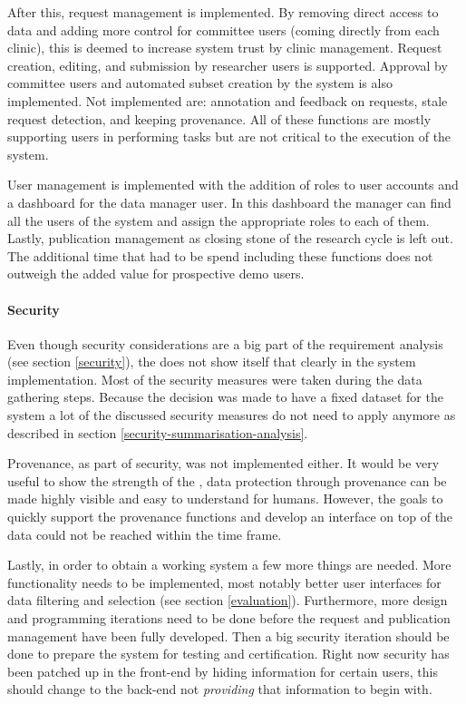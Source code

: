 After this, request management is implemented.
By removing direct access to data and adding more control for committee users (coming directly from each clinic), this is deemed to increase system trust by clinic management.
Request creation, editing, and submission by researcher users is supported.
Approval by committee users and automated subset creation by the system is also implemented.
Not implemented are: annotation and feedback on requests, stale request detection, and keeping provenance.
All of these functions are mostly supporting users in performing tasks but are not critical to the execution of the system.

User management is implemented with the addition of roles to user accounts and a dashboard for the data manager user.
In this dashboard the manager can find all the users of the system and assign the appropriate roles to each of them.
Lastly, publication management as closing stone of the research cycle is left out.
The additional time that had to be spend including these functions does not outweigh the added value for prospective demo users.

\paragraph{Security}
Even though security considerations are a big part of the requirement analysis (see section \ref{security}), the does not show itself that clearly in the system implementation.
Most of the security measures were taken during the data gathering steps.
Because the decision was made to have a fixed dataset for the system a lot of the discussed security measures do not need to apply anymore as described in section \ref{security-summarisation-analysis}.

Provenance, as part of security, was not implemented either.
It would be very useful to show the strength of the \ivfsystem{}, data protection through provenance can be made highly visible and easy to understand for humans.
However, the goals to quickly support the provenance functions and develop an interface on top of the data could not be reached within the time frame.

Lastly, in order to obtain a working system a few more things are needed.
More functionality needs to be implemented, most notably better user interfaces for data filtering and selection (see section \ref{evaluation}).
Furthermore, more design and programming iterations need to be done before the request and publication management have been fully developed.
Then a big security iteration should be done to prepare the system for testing and certification.
Right now security has been patched up in the front-end by hiding information for certain users, this should change to the back-end not \emph{providing} that information to begin with.